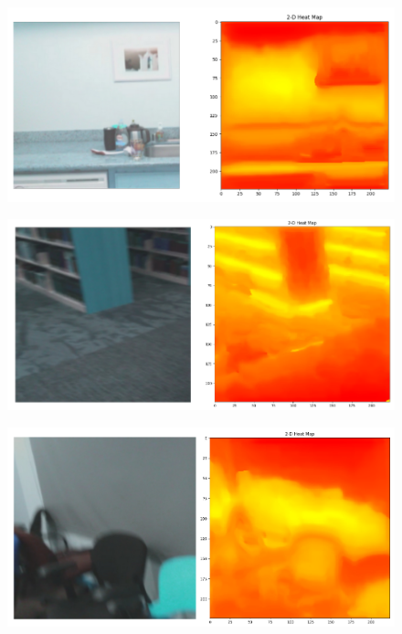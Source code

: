 \documentclass[12pt]{article}
\begin{document}
\begin{figure}[h!]
    \begin{center}
        \includegraphics[scale=0.4]{images/experiments/25.02.2022-image-pretrain-vis1.png}
    \end{center}
\end{figure}

\begin{figure}[h!]
    \begin{center}
        \includegraphics[scale=0.43]{images/experiments/25.02.2022-image-pretrain-vis2.png}
    \end{center}
\end{figure}

\begin{figure}[h!]
    \begin{center}
        \includegraphics[scale=0.35]{images/experiments/25.02.2022-image-pretrain-vis3.png}
    \end{center}
\end{figure}
\end{document}
